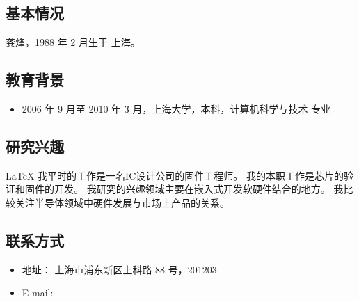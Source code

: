 
\begin{resume}
  \subsection*{基本情况}
    龚烽，1988 年 2 月生于 上海。

  \subsection*{教育背景}
  \begin{itemize}
    \item 2006 年 9 月至 2010 年 3 月，上海大学，本科，计算机科学与技术 专业
  \end{itemize}

  \subsection*{研究兴趣}
    \LaTeX{} 
    我平时的工作是一名IC设计公司的固件工程师。
    我的本职工作是芯片的验证和固件的开发。
    我研究的兴趣领域主要在嵌入式开发软硬件结合的地方。
    我比较关注半导体领域中硬件发展与市场上产品的关系。

  \subsection*{联系方式}
  \begin{itemize}
    \item 地址： 上海市浦东新区上科路 88 号，201203
    \item E-mail: 
  \end{itemize}
\end{resume}
